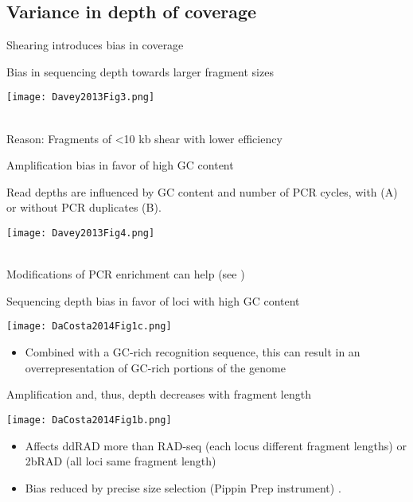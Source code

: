 \documentclass[presentation]{beamer}
\begin{document}
\subsection{Variance in depth of coverage}
\label{sec-3-2}
\begin{frame}[label=sec-3-2-1]{Shearing introduces bias in coverage}
 \begin{center}
Bias in sequencing depth towards larger fragment sizes

\texttt{[image: Davey2013Fig3.png]}

 \tiny{\citep{Davey2013}}\\
\normalsize{
Reason: Fragments of <10 kb shear with lower efficiency}
 \end{center}
\end{frame}

\begin{frame}[label=sec-3-2-2]{Amplification bias in favor of high GC content}
 \begin{center}
Read depths are influenced by GC content and number of PCR cycles, with (A) or without  PCR duplicates (B).

\texttt{[image: Davey2013Fig4.png]}

 \tiny{\citep{Davey2013}}\\
\normalsize{
Modifications of PCR enrichment can help \tiny{(see \citep{Puritz2014b,Benjamini2012})}}

 \end{center}
\end{frame}
\begin{frame}[label=sec-3-2-3]{Sequencing depth bias in favor of loci with high GC content}
\begin{center}
\texttt{[image: DaCosta2014Fig1c.png]}

\tiny{\citep{Dacosta2014}}
\end{center}
\begin{itemize}
\item Combined with a GC-rich recognition sequence, this can result
in an overrepresentation of GC-rich portions of the genome
\end{itemize}
\end{frame}

\begin{frame}[label=sec-3-2-4]{Amplification and, thus, depth decreases with fragment length}
\begin{center}
\texttt{[image: DaCosta2014Fig1b.png]}

\tiny{\citep{Dacosta2014}}
\end{center}
\begin{itemize}
\item Affects ddRAD more than RAD-seq (each locus different fragment lengths) or 2bRAD (all loci same fragment length)
\end{itemize}
\begin{itemize}
\item Bias reduced by precise size selection (Pippin Prep instrument)
\citep{Dacosta2014}.
\end{itemize}
\end{frame}
\end{document}
